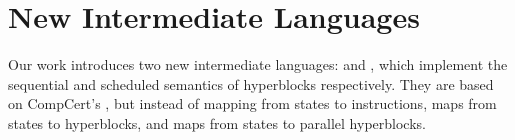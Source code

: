 

\section{New Intermediate Languages}%
\label{sec:hs:rtlblockdef}

Our work introduces two new intermediate languages: \rtlblock{} and \rtlpar{},
which implement the sequential and scheduled semantics of hyperblocks
respectively.  They are based on CompCert's \rtl{}, but instead of mapping from
states to instructions, \rtlblock{} maps from states to hyperblocks, and
\rtlpar{} maps from states to parallel hyperblocks.

